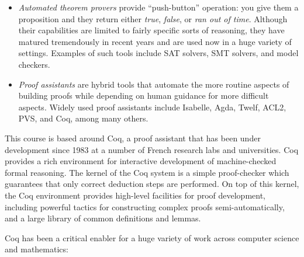 \documentclass[12pt]{report}
\begin{document}
\begin{itemize}
\item  \textit{Automated theorem provers} provide ``push-button'' operation:
         you give them a proposition and they return either \textit{true},
         \textit{false}, or \textit{ran out of time}.  Although their capabilities
         are limited to fairly specific sorts of reasoning, they have
         matured tremendously in recent years and are used now in a
         huge variety of settings.  Examples of such tools include SAT
         solvers, SMT solvers, and model checkers.



\item  \textit{Proof assistants} are hybrid tools that automate the more
         routine aspects of building proofs while depending on human
         guidance for more difficult aspects.  Widely used proof
         assistants include Isabelle, Agda, Twelf, ACL2, PVS, and Coq,
         among many others.

\end{itemize}


    This course is based around Coq, a proof assistant that has been
    under development since 1983 at a number of French research labs
    and universities.  Coq provides a rich environment for interactive
    development of machine-checked formal reasoning.  The kernel of
    the Coq system is a simple proof-checker which guarantees that
    only correct deduction steps are performed.  On top of this
    kernel, the Coq environment provides high-level facilities for
    proof development, including powerful tactics for constructing
    complex proofs semi-automatically, and a large library of common
    definitions and lemmas.


    Coq has been a critical enabler for a huge variety of work across
    computer science and mathematics:
\end{document}

